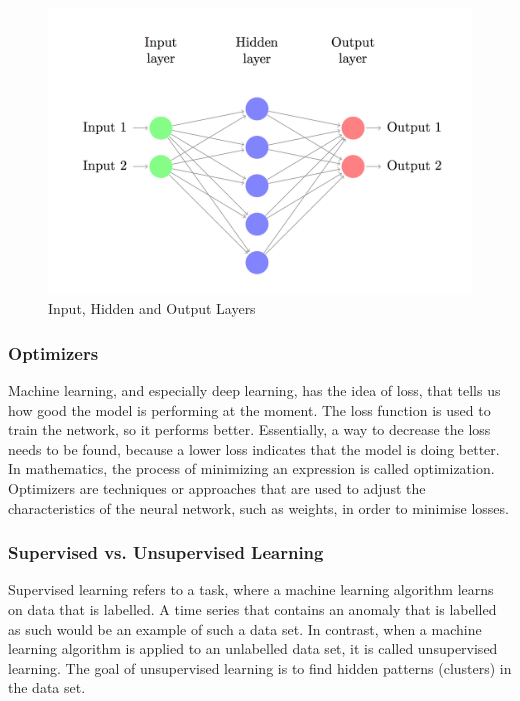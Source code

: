 \begin{figure}[h]
	\centering
	\includegraphics[scale=0.3]{Figures/layers}
	\decoRule
	\caption[Input, Hidden and Output Layers]{Input, Hidden and Output Layers \parencite{DennyBritz2015}}
	\label{fig:layers}
\end{figure}



\subsubsection{Optimizers} \label{optimizer}
Machine learning, and especially deep learning, has the idea of loss, that tells us how good the model is performing at the moment. The loss function is used to train the network, so it performs better. Essentially, a way to decrease the loss needs to be found, because a lower loss indicates that the model is doing better. In mathematics, the process of minimizing an expression is called optimization. Optimizers are techniques or approaches that are used to adjust the characteristics of the neural network, such as weights, in order to minimise losses.

\subsubsection{Supervised vs. Unsupervised Learning}
Supervised learning refers to a task, where a machine learning algorithm learns on data that is labelled. A time series that contains an anomaly that is labelled as such would be an example of such a data set. In contrast, when a machine learning algorithm is applied to an unlabelled data set, it is called unsupervised learning. The goal of unsupervised learning is to find hidden patterns (clusters) in the data set.


